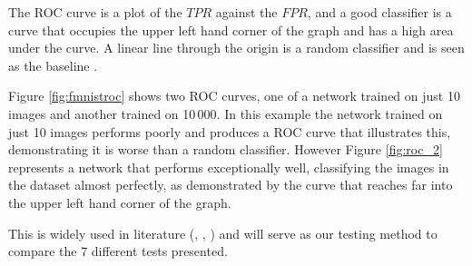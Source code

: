 \documentclass[12pt, onecolumn]{aa}
\begin{document}
The ROC curve is a plot of the $TPR$ against the $FPR$, and a good classifier is a curve that occupies the upper left hand corner of the graph and has a high area under the curve. A linear line through the origin is a random classifier and is seen as the baseline \citep{FAWCETT2006861}. 

Figure \ref{fig:fmnistroc} shows two ROC curves, one of a network trained on just 10 images and another trained on 10\,000. In this example the network trained on just 10 images performs poorly and produces a ROC curve that illustrates this, demonstrating it is worse than a random classifier. However Figure \ref{fig:roc_2} represents a network that performs exceptionally well, classifying the images in the dataset almost perfectly, as demonstrated by the curve that reaches far into the upper left hand corner of the graph.


This is widely used in literature (\cite{sancheztransfer}, \cite{ackerman2018}, \cite{2018arXiv180710406D}) and will serve as our testing method to compare the 7 different tests presented.
\end{document}

